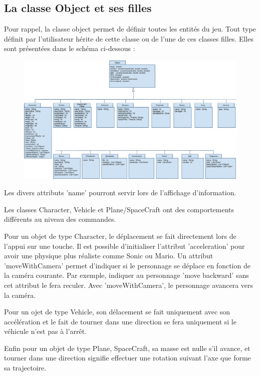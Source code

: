 \subsection{La classe Object et ses filles}

Pour rappel, la classe object permet de définir toutes les entités du jeu.
Tout type définit par l'utilisateur hérite de cette classe ou de l'une de ces classes filles.
Elles sont présentées dans le schéma ci-dessous :

\begin{figure}[h]
 \centering
 \includegraphics[width=\textwidth]{img/objectclass}
\end{figure}

Les divers attributs 'name' pourront servir lors de l'affichage d'information.

Les classes Character, Vehicle et Plane/SpaceCraft ont des comportements différents au niveau des commandes.

Pour un objet de type Character, le déplacement se fait directement lors de l'appui sur une touche. 
Il est possible d'initialiser l'attribut 'acceleration' pour avoir une physique plus réaliste comme Sonic ou Mario.
Un attribut 'moveWithCamera' permet d'indiquer si le personnage se déplace en fonction de la caméra courante. 
Par exemple, indiquer au personnage 'move backward' sans cet attribut le fera reculer.
Avec 'moveWithCamera', le personnage avancera vers la caméra.

Pour un ojet de type Vehicle, son délacement se fait uniquement avec son accélération et le fait de tourner dans une direction
 se fera uniquement si le véhicule n'est pas à l'arrêt.

Enfin pour un objet de type Plane, SpaceCraft, sa masse est nulle s'il avance, et tourner dans une direction signifie
effectuer une rotation suivant l'axe que forme sa trajectoire.

